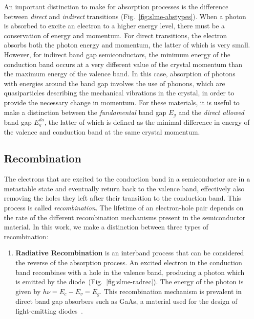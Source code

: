 \begin{refsection}
An important distinction to make for absorption processes is the difference 
between \textit{direct} and \textit{indirect} transitions 
(Fig.~\ref{fig:slme-abstypes}). When a photon is absorbed to excite an 
electron to a higher energy level, there must be a conservation of energy and 
momentum. For direct transitions, the electron absorbs both the photon energy 
and momentum, the latter of which is very small. However, for indirect band 
gap semiconductors, the minimum energy of the conduction band occurs at a very 
different value of the crystal momentum than the maximum energy of the valence 
band. In this case, absorption of photons with energies around the band gap 
involves the use of phonons, which are quasiparticles describing the 
mechanical vibrations in the crystal, in order to provide the necessary change 
in momentum. For these materials, it is useful to make a distinction between 
the \textit{fundamental} band gap $E_g$ and the \textit{direct allowed} band 
gap $E_g^{da}$, the latter of which is defined as the minimal difference in 
energy of the valence and conduction band at the same crystal momentum. 
 
\subsection{Recombination}\label{sec:slme-recombination} 
 
The electrons that are excited to the conduction band in a semiconductor are 
in a metastable state and eventually return back to the valence band, 
effectively also removing the holes they left after their transition to the 
conduction band. This process is called \textit{recombination}. The lifetime 
of an electron-hole pair depends on the rate of the different recombination 
mechanisms present in the semiconductor material. In this work, we make a 
distinction between three types of recombination: 
 
\begin{enumerate}[] 
 
	\item\textbf{Radiative Recombination} is an interband process that can be 
considered the reverse of the absorption process. An excited electron in the 
conduction band recombines with a hole in the valence band, producing a photon 
which is emitted by the diode~(Fig.~\ref{fig:slme-radrec}). The energy of the 
photon is given by $h \nu = E_c - E_v = E_g$. This recombination mechanism is 
prevalent in direct band gap absorbers such as GaAs, a material used for the 
design of light-emitting diodes~\cite{Green1981}. 
 

\end{enumerate}
\end{refsection}
